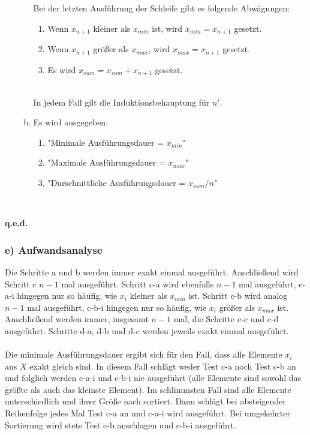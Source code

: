 \documentclass{article}
\begin{document}
\begin{itemize}
\begin{enumerate}[(a)]
            Bei der letzten Ausführung der Schleife gibt es folgende Abwägungen: 
            \begin{enumerate}
                \item Wenn $x_{n+1}$ kleiner als $x_{min}$ ist, wird $x_{min} = x_{n+1}$ gesetzt. 
                \item Wenn $x_{n+1}$ größer als $x_{max}$, wird $x_{max} = x_{n+1}$ gesetzt. 
                \item Es wird $x_{sum} = x_{sum} + x_{n+1}$ gesetzt.
            \end{enumerate}\\
                In jedem Fall gilt die Induktionsbehauptung für $n'$. 
            \item Es wird ausgegeben: 
            \begin{enumerate}
                \item "Minimale Ausführungsdauer = $x_{min}$"
                \item "Maximale Ausführungsdauer = $x_{max}$"
                \item "Durschnittliche Ausführungsdauer = $x_{sum}/n$"
            \end{enumerate}
        \end{enumerate} \\
        
    \end{itemize}
    \textbf{q.e.d.}


    \subsubsection*{e) Aufwandsanalyse}
    Die Schritte a und b werden immer exakt einmal ausgeführt. Anschließend wird Schritt c $n-1$ mal ausgeführt. 
    Schritt c-a wird ebenfalls $n-1$ mal ausgeführt, c-a-i hingegen nur so häufig, wie $x_i$ kleiner als $x_{min}$ ist.
    Schritt c-b wird analog $n-1$ mal ausgeführt, c-b-i hingegen nur so häufig, wie $x_i$ größer als $x_{max}$ ist.
    Anschließend werden immer, insgesamt $n-1$ mal, die Schritte c-c und c-d ausgeführt.
    Schritte d-a, d-b und d-c werden jeweils exakt einmal ausgeführt. \\\\
    Die minimale Ausführungsdauer ergibt sich für den Fall, dass alle Elemente $x_i$ aus $X$ exakt gleich sind. In diesem Fall schlägt
    weder Test c-a noch Test c-b an und folglich werden c-a-i und c-b-i nie ausgeführt (alle Elemente sind sowohl das größte als auch 
    das kleinste Element). Im schlimmsten Fall sind alle Elemente unterschiedlich und ihrer Größe nach sortiert. Dann schlägt bei absteigender
    Reihenfolge jedes Mal Test c-a an und c-a-i wird ausgeführt. Bei umgekehrter Sortierung wird stets Test c-b anschlagen und c-b-i ausgeführt.
\end{document}
